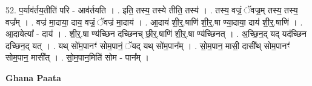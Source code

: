 \documentclass[17pt]{extarticle}
\begin{document}
52. प॒र्याव॑र्तय॒तीति॑ परि - आव॑र्तयति । . इति॒ तस्य॒ तस्ये तीति॒ तस्य॑ । . तस्य॒ वज्रं॒ ॅवज्र॒म् तस्य॒ तस्य॒ वज्र᳚म् । . वज्र॑ मा॒दाया॒ दाय॒ वज्रं॒ ॅवज्र॑ मा॒दाय॑ । . आ॒दाय॑ शी॒र्॒.षाणि॑ शी॒र्॒.षा ण्या॒दाया॒ दाय॑ शी॒र्॒.षाणि॑ । . आ॒दायेत्या᳚ - दाय॑ । . शी॒र्॒.षा ण्य॑च्छिन दच्छिनच् छी॒र्॒.षाणि॑ शी॒र्॒.षा ण्य॑च्छिनत् । . अ॒च्छि॒न॒द् यद् यद॑च्छिन दच्छिन॒द् यत् । . यथ् सो॑म॒पानꣳ॑ सोम॒पानं॒ ॅयद् यथ् सो॑म॒पान᳚म् । . सो॒म॒पान॒ मासी॒ दासी᳚थ् सोम॒पानꣳ॑ सोम॒पान॒ मासी᳚त् । . सो॒म॒पान॒मिति॑ सोम - पान᳚म् । \newline

\textbf{Ghana Paata } \newline
\end{document}
